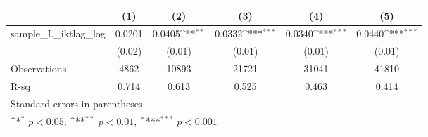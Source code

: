 {
\def\sym#1{\ifmmode^{#1}\else\(^{#1}\)\fi}
\begin{tabular}{l*{5}{c}}
\hline\hline
          &\multicolumn{1}{c}{(1)}         &\multicolumn{1}{c}{(2)}         &\multicolumn{1}{c}{(3)}         &\multicolumn{1}{c}{(4)}         &\multicolumn{1}{c}{(5)}         \\
\hline
sample\_L\_iktlag\_log&   0.0201         &   0.0405\sym{**} &   0.0332\sym{***}&   0.0340\sym{***}&   0.0440\sym{***}\\
          &   (0.02)         &   (0.01)         &   (0.01)         &   (0.01)         &   (0.01)         \\
\hline
Observations&     4862         &    10893         &    21721         &    31041         &    41810         \\
R-sq      &    0.714         &    0.613         &    0.525         &    0.463         &    0.414         \\
\hline\hline
\multicolumn{6}{l}{\footnotesize Standard errors in parentheses}\\
\multicolumn{6}{l}{\footnotesize \sym{*} \(p<0.05\), \sym{**} \(p<0.01\), \sym{***} \(p<0.001\)}\\
\end{tabular}
}
